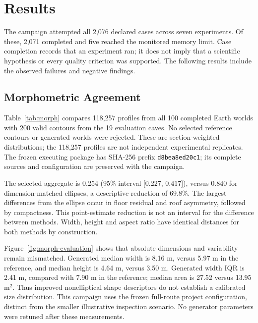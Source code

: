 \documentclass[conference]{IEEEtran}
\begin{document}
\section{Results}
\label{sec:results}
The campaign attempted all 2,076 declared cases across seven experiments. Of these, 2,071 completed and five reached the monitored memory limit. Case completion records that an experiment ran; it does not imply that a scientific hypothesis or every quality criterion was supported. The following results include the observed failures and negative findings.

\subsection{Morphometric Agreement}
Table~\ref{tab:morph} compares 118,257 profiles from all 100 completed Earth worlds with 200 valid contours from the 19 evaluation caves. No selected reference contours or generated worlds were rejected. These are section-weighted distributions; the 118,257 profiles are not independent experimental replicates. The frozen executing package has SHA-256 prefix \texttt{d8bea8ed20c1}; its complete sources and configuration are preserved with the campaign.

The selected aggregate is 0.254 (95\% interval [0.227, 0.417]), versus 0.840 for dimension-matched ellipses, a descriptive reduction of 69.8\%. The largest differences from the ellipse occur in floor residual and roof asymmetry, followed by compactness. This point-estimate reduction is not an interval for the difference between methods. Width, height and aspect ratio have identical distances for both methods by construction.

Figure~\ref{fig:morph-evaluation} shows that absolute dimensions and variability remain mismatched. Generated median width is 8.16 m, versus 5.97 m in the reference, and median height is 4.64 m, versus 3.50 m. Generated width IQR is 2.41 m, compared with 7.90 m in the reference; median area is 27.52 versus 13.95 m$^2$. Thus improved nonelliptical shape descriptors do not establish a calibrated size distribution. This campaign uses the frozen full-route project configuration, distinct from the smaller illustrative inspection scenario. No generator parameters were retuned after these measurements.

\begin{table}[t]
\caption{Terrestrial Stage-C morphology on the evaluation partition: normalized $W_1$ (lower is better). Intervals are for Advanced and use joint cave/world resampling; the aggregate has its own resampled distribution.}
\label{tab:morph}
\centering\small

\end{table}
\end{document}

